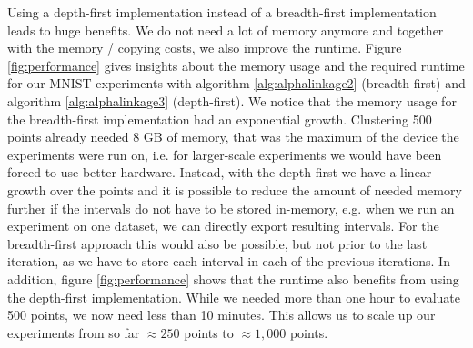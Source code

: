 Using a depth-first implementation instead of a breadth-first implementation leads to huge benefits. We do not need a lot of memory anymore and together with the memory / copying costs, we also improve the runtime. Figure \ref{fig:performance} gives insights about the memory usage and the required runtime for our MNIST experiments with algorithm \ref{alg:alphalinkage2} (breadth-first) and algorithm \ref{alg:alphalinkage3} (depth-first). We notice that the memory usage for the breadth-first implementation had an exponential growth. Clustering 500 points already needed 8 GB of memory, that was the maximum of the device the experiments were run on, i.e. for larger-scale experiments we would have been forced to use better hardware. Instead, with the depth-first we have a linear growth over the points and it is possible to reduce the amount of needed memory further if the intervals do not have to be stored in-memory, e.g. when we run an experiment on one dataset, we can directly export resulting intervals. For the breadth-first approach this would also be possible, but not prior to the last iteration, as we have to store each interval in each of the previous iterations. In addition, figure \ref{fig:performance} shows that the runtime also benefits from using the depth-first implementation. While we needed more than one hour to evaluate 500 points, we now need less than 10 minutes. This allows us to scale up our experiments from so far $\approx 250$ points to $\approx 1,000$ points.


